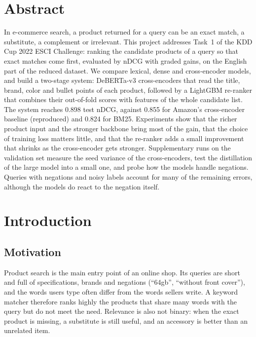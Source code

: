 \documentclass[12pt,a4paper]{report}
\begin{document}
\chapter*{Abstract}
In e-commerce search, a product returned for a query can be an exact match, a substitute, a complement or irrelevant. This project addresses Task~1 of the KDD Cup 2022 ESCI Challenge: ranking the candidate products of a query so that exact matches come first, evaluated by nDCG with graded gains, on the English part of the reduced dataset. We compare lexical, dense and cross-encoder models, and build a two-stage system: DeBERTa-v3 cross-encoders that read the title, brand, color and bullet points of each product, followed by a LightGBM re-ranker that combines their out-of-fold scores with features of the whole candidate list. The system reaches 0.898 test nDCG, against 0.855 for Amazon's cross-encoder baseline (reproduced) and 0.824 for BM25. Experiments show that the richer product input and the stronger backbone bring most of the gain, that the choice of training loss matters little, and that the re-ranker adds a small improvement that shrinks as the cross-encoder gets stronger. Supplementary runs on the validation set measure the seed variance of the cross-encoders, test the distillation of the large model into a small one, and probe how the models handle negations. Queries with negations and noisy labels account for many of the remaining errors, although the models do react to the negation itself.
\clearpage

\tableofcontents
\clearpage

\chapter{Introduction}\label{ch:intro}
\section{Motivation}
Product search is the main entry point of an online shop. Its queries are short and full of specifications, brands and negations (``64gb'', ``without front cover''), and the words users type often differ from the words sellers write. A keyword matcher therefore ranks highly the products that share many words with the query but do not meet the need. Relevance is also not binary: when the exact product is missing, a substitute is still useful, and an accessory is better than an unrelated item.
\end{document}
